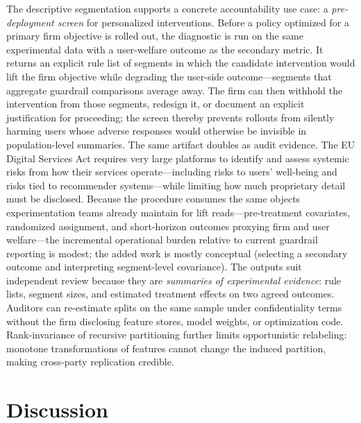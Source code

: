 \documentclass[12pt,a4paper]{article}
\begin{document}
The descriptive segmentation supports a concrete accountability use case: a \emph{pre-deployment screen} for personalized interventions. Before a policy optimized for a primary firm objective is rolled out, the diagnostic is run on the same experimental data with a user-welfare outcome as the secondary metric. It returns an explicit rule list of segments in which the candidate intervention would lift the firm objective while degrading the user-side outcome---segments that aggregate guardrail comparisons average away. The firm can then withhold the intervention from those segments, redesign it, or document an explicit justification for proceeding; the screen thereby prevents rollouts from silently harming users whose adverse responses would otherwise be invisible in population-level summaries. The same artifact doubles as audit evidence. The EU Digital Services Act \citep{dsa2022article34} requires very large platforms to identify and assess systemic risks from how their services operate---including risks to users' well-being and risks tied to recommender systems---while limiting how much proprietary detail must be disclosed. Because the procedure consumes the same objects experimentation teams already maintain for lift reads---pre-treatment covariates, randomized assignment, and short-horizon outcomes proxying firm and user welfare---the incremental operational burden relative to current guardrail reporting is modest; the added work is mostly conceptual (selecting a secondary outcome and interpreting segment-level covariance). The outputs suit independent review because they are \emph{summaries of experimental evidence}: rule lists, segment sizes, and estimated treatment effects on two agreed outcomes. Auditors can re-estimate splits on the same sample under confidentiality terms without the firm disclosing feature stores, model weights, or optimization code. Rank-invariance of recursive partitioning further limits opportunistic relabeling: monotone transformations of features cannot change the induced partition, making cross-party replication credible.

\section{Discussion}
\label{sec:discussion}
\end{document}
